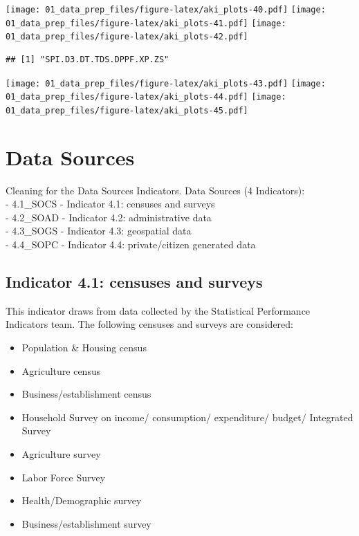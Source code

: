 \documentclass[]{article}
\providecommand{\tightlist}{%
  \setlength{\itemsep}{0pt}\setlength{\parskip}{0pt}}
\begin{document}
\texttt{[image: 01\_data\_prep\_files/figure-latex/aki\_plots-40.pdf]}
\texttt{[image: 01\_data\_prep\_files/figure-latex/aki\_plots-41.pdf]}
\texttt{[image: 01\_data\_prep\_files/figure-latex/aki\_plots-42.pdf]}

\begin{verbatim}
## [1] "SPI.D3.DT.TDS.DPPF.XP.ZS"
\end{verbatim}

\texttt{[image: 01\_data\_prep\_files/figure-latex/aki\_plots-43.pdf]}
\texttt{[image: 01\_data\_prep\_files/figure-latex/aki\_plots-44.pdf]}
\texttt{[image: 01\_data\_prep\_files/figure-latex/aki\_plots-45.pdf]}

\hypertarget{data-sources}{%
\section{Data Sources}\label{data-sources}}

Cleaning for the Data Sources Indicators. Data Sources (4 Indicators):\\
- 4.1\_SOCS - Indicator 4.1: censuses and surveys\\
- 4.2\_SOAD - Indicator 4.2: administrative data\\
- 4.3\_SOGS - Indicator 4.3: geospatial data\\
- 4.4\_SOPC - Indicator 4.4: private/citizen generated data

\hypertarget{indicator-4.1-censuses-and-surveys}{%
\subsection{Indicator 4.1: censuses and
surveys}\label{indicator-4.1-censuses-and-surveys}}

This indicator draws from data collected by the Statistical Performance
Indicators team. The following censuses and surveys are considered:

\begin{itemize}
\tightlist
\item
  Population \& Housing census\\
\item
  Agriculture census\\
\item
  Business/establishment census\\
\item
  Household Survey on income/ consumption/ expenditure/ budget/
  Integrated Survey\\
\item
  Agriculture survey\\
\item
  Labor Force Survey\\
\item
  Health/Demographic survey\\
\item
  Business/establishment survey
\end{itemize}
\end{document}
